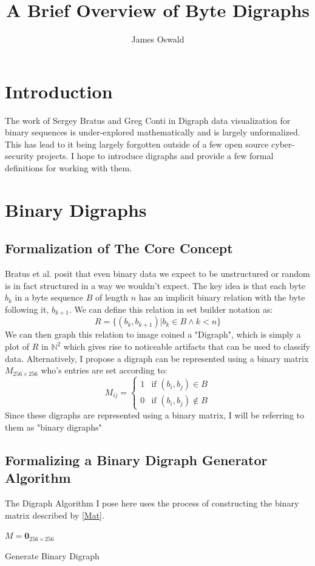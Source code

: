 \documentclass[12pt,a4paper]{article}
\begin{document}
\title{A Brief Overview of Byte Digraphs}
\author{James Oswald}

\maketitle

\section{Introduction}
The work of Sergey Bratus and Greg Conti in Digraph data visualization for binary sequences is under-explored mathematically and is largely unformalized. This has lead to it being largely forgotten outside of a few open source cyber-security projects. I hope to introduce digraphs and provide a few formal definitions for working with them. 

\section{Binary Digraphs}
\subsection{Formalization of The Core Concept}
Bratus et al. posit that even binary data we expect to be unstructured or random is in fact structured in a way we wouldn't expect. The key idea is that each byte $b_k$ in a byte sequence $B$ of length $n$ has an implicit binary relation with the byte following it, $b_{k+1}$. We can define this relation in set builder notation as: 
\[
R = \{(b_k, b_{k+1})|b_k\in B \wedge k<n\} \tag{2.1} \label{Rel}
\]
We can then graph this relation to image coined a "Digraph", which is simply a plot of $R$ in $\mathbb{N}^2$ which gives rise to noticeable artifacts that can be used to classify data. Alternatively, I propose a digraph can be represented using a binary matrix $M_{256\times256}$  who's entries are set according to: 
\[
M_{ij} = 
\left\{
\begin{array}{ll}
1 & \mbox{if }(b_i, b_j)\in B \\
0 & \mbox{if }(b_i, b_j)\notin B
\end{array}
\right.
\tag{2.2} \label{Mat}
\]
Since these digraphs are represented using a binary matrix, I will be referring to them as "binary digraphs"

\pagebreak
\subsection{Formalizing a Binary Digraph Generator Algorithm}
The Digraph Algorithm I pose here uses the process of constructing the binary matrix described by \eqref{Mat}.
\begin{algorithm}
\DontPrintSemicolon
{}
\BlankLine
$M = \textbf{0}_{256\times256}$\;
\caption{Generate Binary Digraph}
\label{bdgA}
\end{algorithm}
\end{document}
